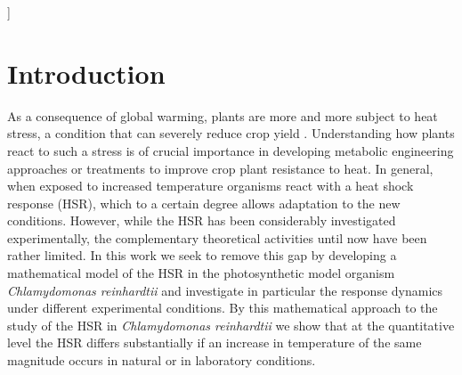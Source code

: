 \documentclass[oneside, 10pt, a4paper, twocolumn]{article}
\begin{document}
]



\section{Introduction}

As a consequence of global warming, plants are more and more subject to heat stress, a condition that can severely reduce crop yield \cite{Lobell2011,Deryng2014}.
Understanding how plants react to such a stress is of crucial importance in developing metabolic engineering approaches or treatments to improve crop plant resistance to heat. 
In general, when exposed to increased temperature organisms react
with a heat shock response (HSR), which to a certain degree allows adaptation to the new conditions. 
However, while the HSR has been %
considerably investigated experimentally, the complementary theoretical activities %
until now have been rather limited. In this work we seek to remove this gap by developing a mathematical model of the HSR in the photosynthetic model organism \emph{Chlamydomonas reinhardtii} and investigate in particular the response dynamics under different experimental conditions. By this mathematical approach to the study of the HSR in \emph{Chlamydomonas reinhardtii} we show that at the quantitative level the HSR differs substantially if an increase in temperature of the same magnitude occurs in natural or in laboratory conditions.
\end{document}
